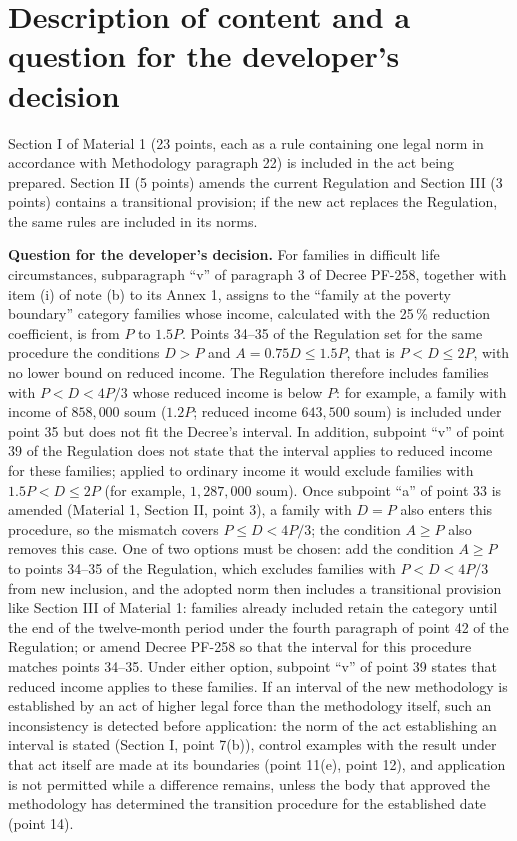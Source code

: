 \documentclass[14pt,a4paper]{extarticle}
\begin{document}
\section{Description of content and a question for the developer’s decision}\label{sec:q}
Section I of Material 1 (23 points, each as a rule containing one legal norm in accordance with Methodology paragraph 22) is included in the act being prepared. Section II (5 points) amends the current Regulation and Section III (3 points) contains a transitional provision; if the new act replaces the Regulation, the same rules are included in its norms.

\textbf{Question for the developer’s decision.} For families in difficult life circumstances, subparagraph “v” of paragraph 3 of Decree PF-258, together with item (i) of note (b) to its Annex 1, assigns to the “family at the poverty boundary” category families whose income, calculated with the 25\,\% reduction coefficient, is from $P$ to $1.5P$\cite{pf258}. Points 34–35 of the Regulation set for the same procedure the conditions $D>P$ and $A=0.75D\le1.5P$, that is $P<D\le2P$, with no lower bound on reduced income. The Regulation therefore includes families with $P<D<4P/3$ whose reduced income is below $P$: for example, a family with income of $858{,}000$ soum ($1.2P$; reduced income $643{,}500$ soum) is included under point 35 but does not fit the Decree’s interval. In addition, subpoint “v” of point 39 of the Regulation does not state that the interval applies to reduced income for these families; applied to ordinary income it would exclude families with $1.5P<D\le2P$ (for example, $1{,}287{,}000$ soum). Once subpoint “a” of point 33 is amended (Material 1, Section II, point 3), a family with $D=P$ also enters this procedure, so the mismatch covers $P\le D<4P/3$; the condition $A\ge P$ also removes this case. One of two options must be chosen: add the condition $A\ge P$ to points 34–35 of the Regulation, which excludes families with $P<D<4P/3$ from new inclusion, and the adopted norm then includes a transitional provision like Section III of Material 1: families already included retain the category until the end of the twelve-month period under the fourth paragraph of point 42 of the Regulation; or amend Decree PF-258 so that the interval for this procedure matches points 34–35. Under either option, subpoint “v” of point 39 states that reduced income applies to these families. If an interval of the new methodology is established by an act of higher legal force than the methodology itself, such an inconsistency is detected before application: the norm of the act establishing an interval is stated (Section I, point 7(b)), control examples with the result under that act itself are made at its boundaries (point 11(e), point 12), and application is not permitted while a difference remains, unless the body that approved the methodology has determined the transition procedure for the established date (point 14).
\end{document}
